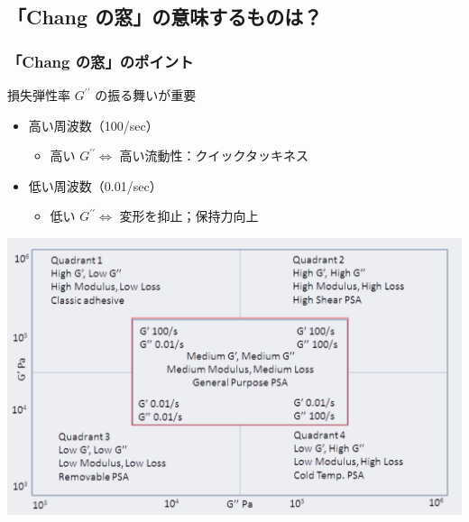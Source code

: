 \documentclass[12pt, dvipdfmx]{beamer}
\begin{document}
\subsection{「Chang の窓」の意味するものは？}
\begin{frame}
	\frametitle{「Chang の窓」のポイント}
	\begin{alertblock}{損失弾性率 $G^{\prime \prime}$ の振る舞いが重要}
		\begin{itemize}
			\item 高い周波数（100/sec）
			\begin{itemize}
				\item 高い $G^{\prime \prime} \Leftrightarrow$ 高い流動性：クイックタッキネス
			\end{itemize}
			\item 低い周波数（0.01/sec）
			\begin{itemize}
				\item 低い $G^{\prime \prime} \Leftrightarrow$ 変形を抑止；保持力向上
			\end{itemize}
		\end{itemize}

		\vspace{3mm}
		\centering
			\includegraphics[width=.5\textwidth]{ChangFrequencies_2.png}
	\end{alertblock}	
\end{frame}
\end{document}
